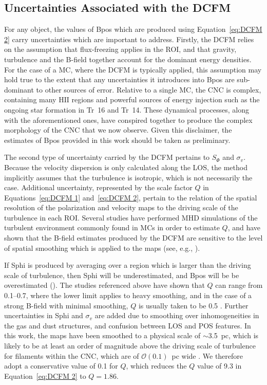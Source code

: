 \subsection{Uncertainties Associated with the DCFM}\label{DCFM limitations}

For any object, the values of \gls{Bpos} which are produced using Equation~\ref{eq:DCFM 2} carry uncertainties which are important to address. Firstly, the DCFM relies on the assumption that flux-freezing applies in the ROI, and that gravity, turbulence and the B-field together account for the dominant energy densities. For the case of a MC, where the DCFM is typically applied, this assumption may hold true to the extent that any uncertainties it introduces into \gls{Bpos} are sub-dominant to other sources of error. Relative to a single MC, the CNC is complex, containing many $\mathrm{HII}$ regions and powerful sources of energy injection such as the ongoing star formation in Tr~16 and Tr~14. These dynamical processes, along with the aforementioned ones, have conspired together to produce the complex morphology of the CNC that we now observe. Given this disclaimer, the estimates of \gls{Bpos} provided in this work should be taken as preliminary.

The second type of uncertainty carried by the DCFM pertains to $S_{\Phi}$ and $\sigma_{v}$. Because the velocity dispersion is only calculated along the LOS, the method implicitly assumes that the turbulence is isotropic, which is not necessarily the case. Additional uncertainty, represented by the scale factor $Q$ in Equations~\ref{eq:DCFM 1} and~\ref{eq:DCFM 2}, pertain to the relation of the spatial resolution of the polarization and velocity maps to the driving scale of the turbulence in each ROI\@. Several studies have performed MHD simulations of the turbulent environment commonly found in MCs in order to estimate $Q$, and have shown that the B-field estimates produced by the DCFM are sensitive to the level of spatial smoothing which is applied to the maps (see, e.g., \citet{ostriker2001density,padoan2001theoretical,heitsch2001magnetic,kudoh2003nonlinear}).


If \gls{Sphi} is produced by averaging over a region which is larger than the driving scale of turbulence, then \gls{Sphi} will be underestimated, and \gls{Bpos} will be be overestimated (\citet{cho2016technique}). The studies referenced above have shown that $Q$ can range from 0.1--0.7, where the lower limit applies to heavy smoothing, and in the case of a strong B-field with minimal smoothing, $Q$ is usually taken to be 0.5 \citep{houde2004evaluating}. Further uncertainties in \gls{Sphi} and $\sigma_{v}$ are added due to smoothing over inhomogeneities in the gas and dust structures, and confusion between LOS and POS features. In this work, the maps have been smoothed to a physical scale of $\sim$3.5~pc, which is likely to be at least an order of magnitude above the driving scale of turbulence for filaments within the CNC, which are of $\mathcal{O}(0.1)$~pc wide \citep{preibisch2012herschel}. We therefore adopt a conservative value of 0.1 for $Q$, which reduces the $Q$ value of 9.3 in Equation~\ref{eq:DCFM 2} to $Q = 1.86$.

